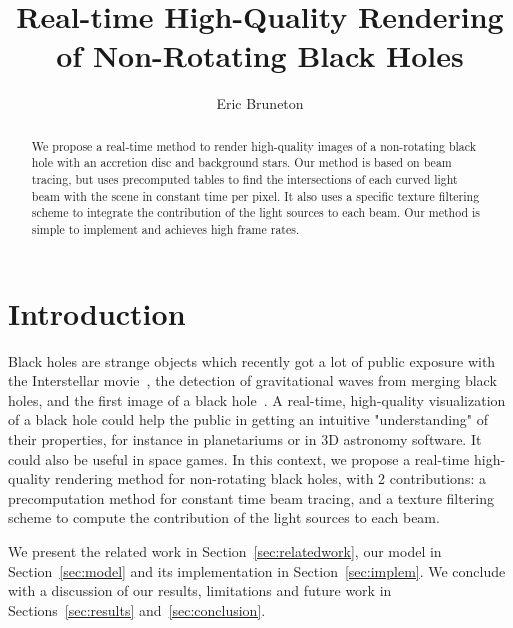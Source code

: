 \documentclass{document}
\title[Real-time High-Quality Rendering of Non-Rotating Black Holes]%
      {Real-time High-Quality Rendering of Non-Rotating Black Holes}
\author[E. Bruneton]{\parbox{\textwidth}{\centering Eric Bruneton}}
\begin{document}

\maketitle

\begin{abstract}
We propose a real-time method to render high-quality images of a non-rotating 
black hole with an accretion disc and background stars. Our method is based on 
beam tracing, but uses precomputed tables to find the intersections of each
curved light beam with the scene in constant time per pixel. It also uses a 
specific texture filtering scheme to integrate the contribution of the light 
sources to each beam. Our method is simple to implement and achieves high frame 
rates.
\end{abstract}  

\section{Introduction}

Black holes are strange objects which recently got a lot of  public exposure 
with the Interstellar movie~\cite{James2015}, the detection of gravitational 
waves from merging black holes\cite{GRWave2016}, and the first image of a black 
hole~\cite{EHT2019}. A real-time, high-quality visualization of a black hole 
could help the public in getting an intuitive "understanding" of their 
properties, for instance in planetariums or in 3D astronomy software. It could 
also be useful in space games. In this context, we propose a real-time 
high-quality rendering method for non-rotating black holes, with 2 
contributions: a precomputation method for constant time beam tracing, and a 
texture filtering scheme to compute the contribution of the light sources to 
each beam.

We present the related work in Section~\ref{sec:relatedwork}, our model in 
Section~\ref{sec:model} and its implementation in Section~\ref{sec:implem}. We 
conclude with a discussion of our results, limitations and future work in 
Sections~\ref{sec:results} and~\ref{sec:conclusion}.
\end{document}
